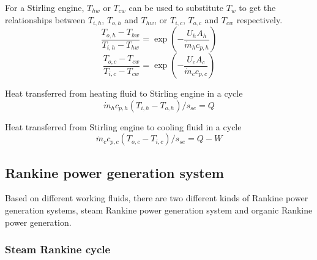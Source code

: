 For a Stirling engine, $T_{hw}$ or $T_{cw}$ can be used to substitute $T_w$ to get the relationships between $T_{i,h}$, $T_{o,h}$ and $T_{hw}$, or $T_{i,c}$, $T_{o,c}$ and $T_{cw}$ respectively.
\begin{equation}
	\frac{T_{o,h}-T_{hw}}{T_{i,h}-T_{hw}}=\exp(-\frac{U_hA_h}{\dot{m}_hc_{p,h}})
	\label{Eq:T_h}
\end{equation}
\begin{equation}
	\frac{T_{o,c}-T_{cw}}{T_{i,c}-T_{cw}}=\exp(-\frac{U_cA_c}{\dot{m}_cc_{p,c}})
	\label{Eq:T_c}
\end{equation}

Heat transferred from heating fluid to Stirling engine in a cycle
\begin{equation}
	\dot{m}_hc_{p,h}(T_{i,h}-T_{o,h})/s_{se} = Q
	\label{Eq:q_h}
\end{equation}

Heat transferred from Stirling engine to cooling fluid in a cycle
\begin{equation}
	\dot{m}_cc_{p,c}(T_{o,c}-T_{i,c})/s_{se} = Q - W
	\label{Eq:q_c}
\end{equation}


\subsection{Rankine power generation system}

Based on different working fluids, there are two different kinds of Rankine power generation systems, steam Rankine power generation system and organic Rankine power generation.
\subsubsection{Steam Rankine cycle}
  
